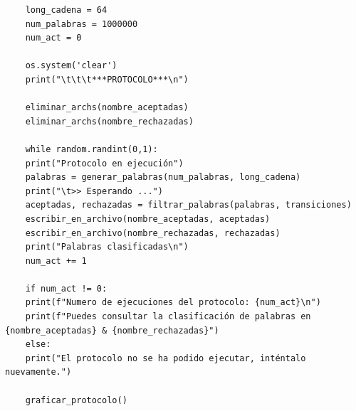 \documentclass[11pt]{article} %
\begin{document}
\begin{lstlisting}
	long_cadena = 64
	num_palabras = 1000000
	num_act = 0
	
	os.system('clear')
	print("\t\t\t***PROTOCOLO***\n")
	
	eliminar_archs(nombre_aceptadas)
	eliminar_archs(nombre_rechazadas)
	
	while random.randint(0,1):
	print("Protocolo en ejecución")
	palabras = generar_palabras(num_palabras, long_cadena)
	print("\t>> Esperando ...")
	aceptadas, rechazadas = filtrar_palabras(palabras, transiciones)
	escribir_en_archivo(nombre_aceptadas, aceptadas)
	escribir_en_archivo(nombre_rechazadas, rechazadas)
	print("Palabras clasificadas\n")
	num_act += 1
	
	if num_act != 0:
	print(f"Numero de ejecuciones del protocolo: {num_act}\n")
	print(f"Puedes consultar la clasificación de palabras en {nombre_aceptadas} & {nombre_rechazadas}")
	else:
	print("El protocolo no se ha podido ejecutar, inténtalo nuevamente.")
	
	graficar_protocolo()
	
		
	\end{lstlisting}
	
\end{document}
